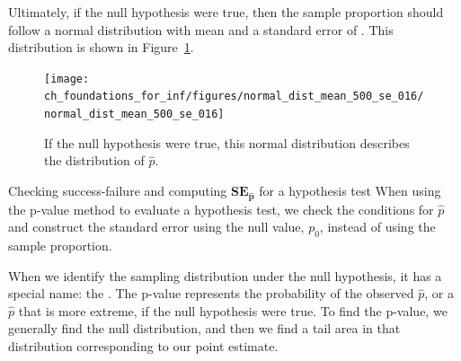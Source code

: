 \begin{examplewrap}
\begin{nexample}
  Ultimately, if the null hypothesis were true, then the sample
  proportion should follow a normal distribution with mean
  \pewcoalpollnullvalue{}
  and a standard error of \pewcoalpollnullse{}.
  This distribution is shown in
  Figure~\ref{normal_dist_mean_500_se_016}.
\end{nexample}
\end{examplewrap}

\begin{figure}[h]
\centering
\texttt{[image: ch\_foundations\_for\_inf/figures/normal\_dist\_mean\_500\_se\_016/normal\_dist\_mean\_500\_se\_016]}
\caption{
  If the null hypothesis were true, this normal distribution
  describes the distribution of $\hat{p}$.}
\label{normal_dist_mean_500_se_016}
\end{figure}

\begin{onebox}{Checking success-failure and computing
      $\mathbf{SE_{\hat{p}}}$ for a hypothesis test}
  When using the p-value method to evaluate a hypothesis test,
  we check the conditions for $\hat{p}$ and construct the
  standard error using the null value, $p_0$, instead of using
  the sample proportion.
\end{onebox}

When we identify the sampling distribution under the null hypothesis,
it has a special name: the .
The p-value represents the probability of the observed $\hat{p}$,
or a $\hat{p}$ that is more extreme,
if the null hypothesis were true.
To find the p-value, we generally find the null distribution,
and then we find a tail area in that distribution corresponding
to our point estimate.

